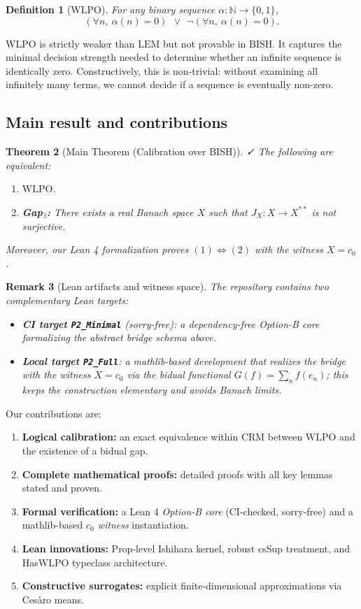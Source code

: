 \documentclass[11pt]{article}  %
\newtheorem{theorem}{Theorem}[section]
\newtheorem{definition}[theorem]{Definition}
\newtheorem{remark}[theorem]{Remark}
\newenvironment{thm}{\begin{theorem}}{\end{theorem}}
\newenvironment{defi}{\begin{definition}}{\end{definition}}
\newenvironment{rem}{\begin{remark}}{\end{remark}}
\newcommand{\leanok}{\textsf{\small \textcolor{green!70!black}{✓}}}
\newcommand{\N}{\mathbb{N}}
\newcommand{\WLPO}{\mathrm{WLPO}}
\newcommand{\BISH}{\mathrm{BISH}}
\newcommand{\CRM}{\mathrm{CRM}}
\newcommand{\LEM}{\mathrm{LEM}}
\begin{document}
\begin{defi}[$\WLPO$]
For any binary sequence $\alpha:\N\to\{0,1\}$,
\[
(\forall n,\ \alpha(n)=0)\ \ \vee\ \ \neg(\forall n,\ \alpha(n)=0).
\]
\end{defi}

$\WLPO$ is strictly weaker than $\LEM$ but not provable in $\BISH$. It captures the minimal decision strength needed to determine whether an infinite sequence is identically zero. Constructively, this is non-trivial: without examining all infinitely many terms, we cannot decide if a sequence is eventually non-zero.

\subsection{Main result and contributions}

\begin{thm}[Main Theorem (Calibration over BISH)]\leanok
The following are equivalent:
\begin{enumerate}
\item $\WLPO$.
\item \textbf{Gap$_{\exists}$:} There exists a real Banach space $X$ such that $J_X:X\to X^{**}$ is not surjective.
\end{enumerate}
Moreover, our Lean 4 formalization proves $(1) \Leftrightarrow (2)$ with the witness $X=c_0$.
\end{thm}

\begin{rem}[Lean artifacts and witness space]
The repository contains two complementary Lean targets:
\begin{itemize}
\item \textbf{CI target \texttt{P2\_Minimal}} (sorry-free): a dependency-free \emph{Option-B core} formalizing the abstract bridge schema above.
\item \textbf{Local target \texttt{P2\_Full}}: a mathlib-based development that \emph{realizes} the bridge with the witness $X=c_0$ via the bidual functional $G(f)=\sum_n f(e_n)$; this keeps the construction elementary and avoids Banach limits.
\end{itemize}
\end{rem}

Our contributions are:
\begin{enumerate}[label=\arabic*.]
\item \textbf{Logical calibration:} an exact equivalence within $\CRM$ between $\WLPO$ and the existence of a bidual gap.
\item \textbf{Complete mathematical proofs:} detailed proofs with all key lemmas stated and proven.
\item \textbf{Formal verification:} a Lean 4 \emph{Option-B core} (CI-checked, sorry-free) and a mathlib-based \emph{$c_0$ witness} instantiation.
\item \textbf{Lean innovations:} Prop-level Ishihara kernel, robust csSup treatment, and HasWLPO typeclass architecture.
\item \textbf{Constructive surrogates:} explicit finite-dimensional approximations via Ces\`aro means.
\end{enumerate}
\end{document}
